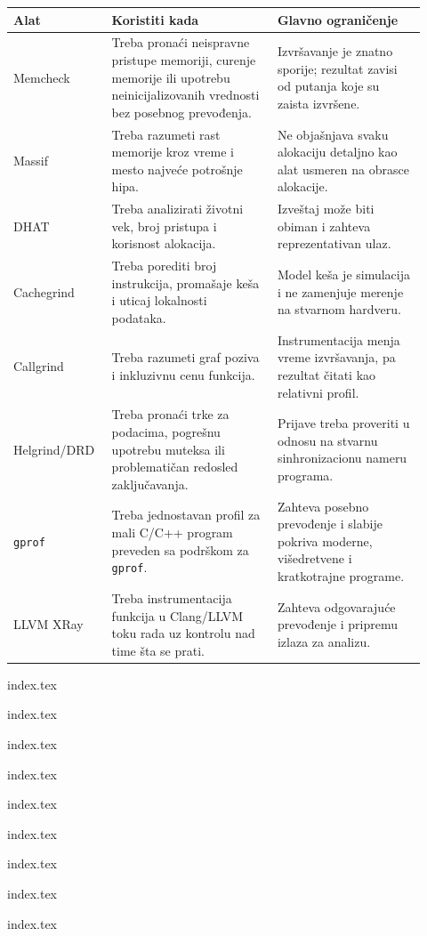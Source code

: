 \begin{longtable}{@{}p{0.20\linewidth}p{0.38\linewidth}p{0.34\linewidth}@{}}
\toprule
Alat & Koristiti kada & Glavno ograničenje \\
\midrule
\endhead
Memcheck & Treba pronaći neispravne pristupe memoriji, curenje memorije ili upotrebu neinicijalizovanih vrednosti bez posebnog prevođenja. & Izvršavanje je znatno sporije; rezultat zavisi od putanja koje su zaista izvršene. \\
Massif & Treba razumeti rast memorije kroz vreme i mesto najveće potrošnje hipa. & Ne objašnjava svaku alokaciju detaljno kao alat usmeren na obrasce alokacije. \\
DHAT & Treba analizirati životni vek, broj pristupa i korisnost alokacija. & Izveštaj može biti obiman i zahteva reprezentativan ulaz. \\
Cachegrind & Treba porediti broj instrukcija, promašaje keša i uticaj lokalnosti podataka. & Model keša je simulacija i ne zamenjuje merenje na stvarnom hardveru. \\
Callgrind & Treba razumeti graf poziva i inkluzivnu cenu funkcija. & Instrumentacija menja vreme izvršavanja, pa rezultat čitati kao relativni profil. \\
Helgrind/DRD & Treba pronaći trke za podacima, pogrešnu upotrebu muteksa ili problematičan redosled zaključavanja. & Prijave treba proveriti u odnosu na stvarnu sinhronizacionu nameru programa. \\
\texttt{gprof} & Treba jednostavan profil za mali C/C++ program preveden sa podrškom za \texttt{gprof}. & Zahteva posebno prevođenje i slabije pokriva moderne, višedretvene i kratkotrajne programe. \\
LLVM XRay & Treba instrumentacija funkcija u Clang/LLVM toku rada uz kontrolu nad time šta se prati. & Zahteva odgovarajuće prevođenje i pripremu izlaza za analizu. \\
\bottomrule
\end{longtable}

{index.tex}

{index.tex}

{index.tex}

{index.tex}

{index.tex}

{index.tex}

{index.tex}

{index.tex}

{index.tex}
